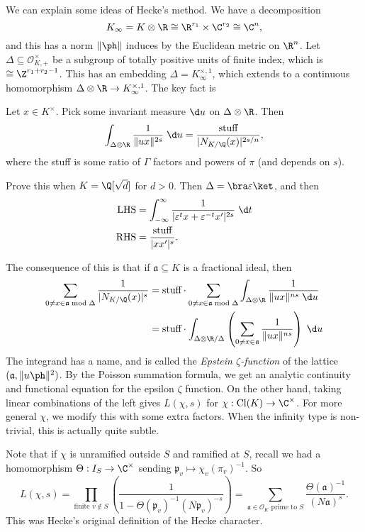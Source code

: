 \documentclass[a4paper]{article}
\DeclareMathOperator\Cl{\mathrm{Cl}}
\begin{document}
We can explain some ideas of Hecke's method. We have a decomposition
\[
  K_\infty =K \otimes \R \cong \R^{r_1} \times \C^{r_2} \cong \C^n,
\]
and this has a norm $\|\ph\|$ induces by the Euclidean metric on $\R^n$. Let $\Delta \subseteq \mathcal{O}_{K, +}^\times$ be a subgroup of totally positive units of finite index, which is $\cong \Z^{r_1 + r_2 - 1}$. This has an embedding $\Delta = K_\infty^{\times, 1}$, which extends to a continuous homomorphism $\Delta \otimes \R \to K_\infty^{\times, 1}$. The key fact is
\begin{prop}
  Let $x \in K^\times$. Pick some invariant measure $\d u$ on $\Delta \otimes \R$. Then
  \[
    \int_{\Delta \otimes \R} \frac{1}{\|ux\|^{2s}} \;\d u = \frac{\text{stuff}}{|N_{K/\Q}(x)|^{2s/n}},
  \]
  where the stuff is some ratio of $\Gamma$ factors and powers of $\pi$ (and depends on $s$).
\end{prop}
\begin{ex}
  Prove this when $K = \Q[\sqrt{d}]$ for $d > 0$. Then $\Delta = \bra \varepsilon\ket$, and then
  \begin{align*}
    \text{LHS} &= \int_{-\infty}^\infty \frac{1}{|\varepsilon^t x + \varepsilon^{-t} x'|^{2s}}\;\d t\\
    \text{RHS} &= \frac{\text{stuff}}{|xx'|^s}.
  \end{align*}
\end{ex}
The consequence of this is that if $\mathfrak{a} \subseteq K$ is a fractional ideal, then
\begin{align*}
  \sum_{0 \not= x \in \mathfrak{a}\bmod \Delta} \frac{1}{|N_{K/\Q}(x)|^s} &= \text{stuff} \cdot \sum_{0 \not= x \in \mathfrak{a}\bmod \Delta} \int_{\Delta \otimes \R} \frac{1}{\|u x\|^{ns}\;\d u}\\
  &= \text{stuff} \cdot \int_{\Delta \otimes \R/\Delta} \left(\sum_{0 \not= x \in \mathfrak{a}} \frac{1}{\|u x\|^{ns}}\right)\;\d u
\end{align*}
The integrand has a name, and is called the \emph{Epstein $\zeta$-function} of the lattice $(\mathfrak{a}, \|u\ph\|^2)$. By the Poisson summation formula, we get an analytic continuity and functional equation for the epsilon $\zeta$ function. On the other hand, taking linear combinations of the left gives $L(\chi, s)$ for $\chi: \Cl(K) \to \C^\times$. For more general $\chi$, we modify this with some extra factors. When the infinity type is non-trivial, this is actually quite subtle.

Note that if $\chi$ is unramified outside $S$ and ramified at $S$, recall we had a homomorphism $\Theta: I_S \to \C^\times$ sending $\mathfrak{p}_v \mapsto \chi_v(\pi_v)^{-1}$. So
\[
  L(\chi, s) = \prod_{\text{finite }v \not \in S} \left(\frac{1}{1 - \Theta(\mathfrak{p}_v)^{-1} (N\mathfrak{p}_v)^{-s}}\right) = \sum_{\mathfrak{a} \in \mathcal{O}_K\text{ prime to }S} \frac{\Theta(\mathfrak{a})^{-1}}{(N\mathfrak{a})^s}.
\]
This was Hecke's original definition of the Hecke character.
\end{document}
